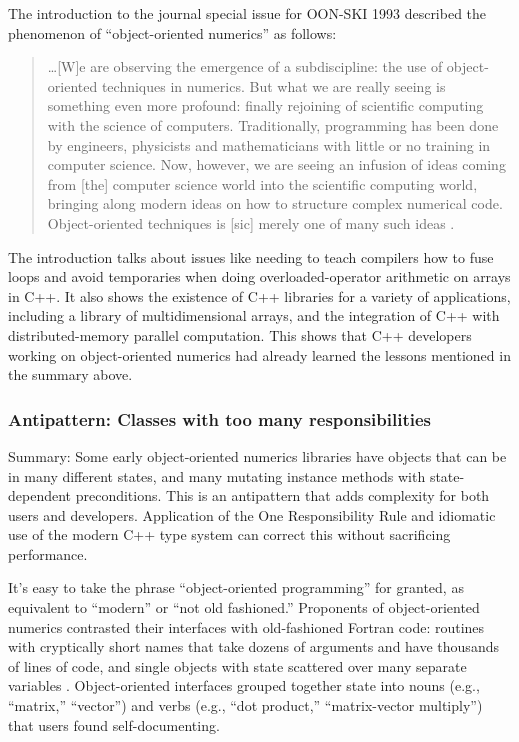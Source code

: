 The introduction to the journal special issue for OON-SKI 1993
described the phenomenon of ``object-oriented numerics'' as follows:
\begin{quote}
  \ldots [W]e are observing the emergence of a subdiscipline: the use
  of object-oriented techniques in numerics. But what we are really
  seeing is something even more profound: finally rejoining of
  scientific computing with the science of computers. Traditionally,
  programming has been done by engineers, physicists and
  mathematicians with little or no training in computer science. Now,
  however, we are seeing an infusion of ideas coming from [the]
  computer science world into the scientific computing world, bringing
  along modern ideas on how to structure complex numerical
  code. Object-oriented techniques is [sic] merely one of many such
  ideas \cite{Vermeulen1993}.
\end{quote}
The introduction talks about issues like needing to teach compilers
how to fuse loops and avoid temporaries when doing overloaded-operator
arithmetic on arrays in C++. It also shows the existence of C++
libraries for a variety of applications, including a library of
multidimensional arrays, and the integration of C++ with
distributed-memory parallel computation.  This shows that C++
developers working on object-oriented numerics had already learned the
lessons mentioned in the summary above.

\subsubsection{Antipattern: Classes with too many responsibilities}
\label{SSS:90s:OON:stateful}

Summary: Some early object-oriented numerics libraries have objects
that can be in many different states, and many mutating instance
methods with state-dependent preconditions.  This is an antipattern
that adds complexity for both users and developers.  Application of
the One Responsibility Rule and idiomatic use of the modern C++ type
system can correct this without sacrificing performance.

It's easy to take the phrase ``object-oriented programming'' for
granted, as equivalent to ``modern'' or ``not old fashioned.''
Proponents of object-oriented numerics contrasted their interfaces
with old-fashioned Fortran code: routines with cryptically short names
that take dozens of arguments and have thousands of lines of code, and
single objects with state scattered over many separate variables
\cite{arge1996oon}.  Object-oriented interfaces grouped together state
into nouns (e.g., ``matrix,'' ``vector'') and verbs (e.g., ``dot
product,'' ``matrix-vector multiply'') that users found
self-documenting.

